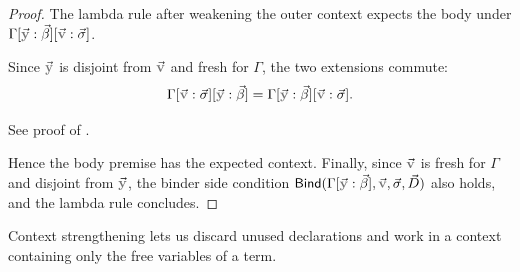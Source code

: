 \begin{proof}
  The lambda rule after weakening the outer context expects the body under \(\Gamma[\vec{\var{y}}:\vec\beta][\vec{\var{v}}:\vec\sigma]\).
  \begin{fact}
    Since \(\vec{\var{y}}\) is disjoint from \(\vec{\var{v}}\) and fresh for \(\Gamma\), the two extensions commute:
    \[
      \Gamma[\vec{\var{v}}:\vec\sigma][\vec{\var{y}}:\vec\beta] = \Gamma[\vec{\var{y}}:\vec\beta][\vec{\var{v}}:\vec\sigma].
    \]
  \end{fact}
  \begin{subproof}
    See proof of {\small{}}.
  \end{subproof}
  Hence the body premise has the expected context. Finally, since \(\vec{\var{v}}\) is fresh for \(\Gamma\) and disjoint from \(\vec{\var{y}}\), the binder side condition \(\mathsf{Bind}(\Gamma[\vec{\var{y}}:\vec\beta],\vec{\var{v}},\vec\sigma,\vec D)\) also holds, and the lambda rule concludes.
\end{proof}

Context strengthening lets us discard unused declarations and work in a context
containing only the free variables of a term.

